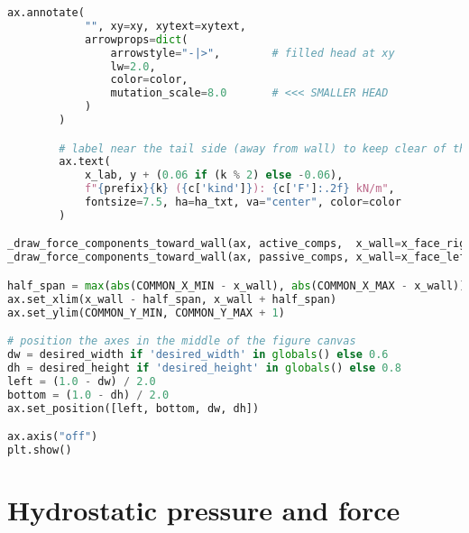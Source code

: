 \begin{lstlisting}[language=Python]
        ax.annotate(
            "", xy=xy, xytext=xytext,
            arrowprops=dict(
                arrowstyle="-|>",        # filled head at xy
                lw=2.0,
                color=color,
                mutation_scale=8.0       # <<< SMALLER HEAD
            )
        )

        # label near the tail side (away from wall) to keep clear of the head/PoA
        ax.text(
            x_lab, y + (0.06 if (k % 2) else -0.06),
            f"{prefix}{k} ({c['kind']}): {c['F']:.2f} kN/m",
            fontsize=7.5, ha=ha_txt, va="center", color=color
        )

_draw_force_components_toward_wall(ax, active_comps,  x_wall=x_face_right, to_wall_sign=-1, color="red",  prefix="Fₐ")
_draw_force_components_toward_wall(ax, passive_comps, x_wall=x_face_left,  to_wall_sign=+1, color="navy", prefix="Fₚ")

half_span = max(abs(COMMON_X_MIN - x_wall), abs(COMMON_X_MAX - x_wall))
ax.set_xlim(x_wall - half_span, x_wall + half_span)
ax.set_ylim(COMMON_Y_MIN, COMMON_Y_MAX + 1)

# position the axes in the middle of the figure canvas
dw = desired_width if 'desired_width' in globals() else 0.6
dh = desired_height if 'desired_height' in globals() else 0.8
left = (1.0 - dw) / 2.0
bottom = (1.0 - dh) / 2.0
ax.set_position([left, bottom, dw, dh])

ax.axis("off")
plt.show()
\end{lstlisting}

\section{Hydrostatic pressure and force}

